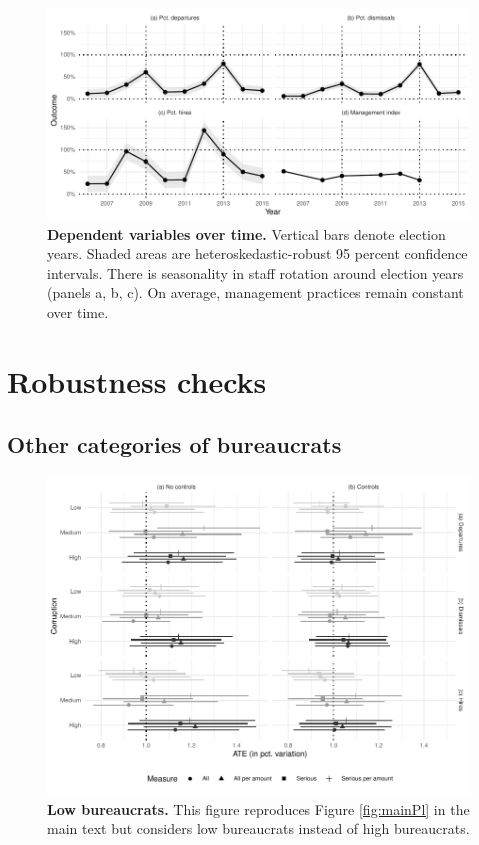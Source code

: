 \documentclass[12pt,a4paper]{article}
\theoremstyle{definition}
\begin{document}
{\begin{figure}[H]
    \centering
    \includegraphics{figures/dependentVariables}
    \caption{{\bf Dependent variables over time.} Vertical bars denote election years. Shaded areas are heteroskedastic-robust 95 percent confidence intervals. There is seasonality in staff rotation around election years (panels a, b, c). On average, management practices remain constant over time.}
    \label{fig:dvs}
\end{figure}

\section{Robustness checks}
\label{app:robustness}

\subsection{Other categories of bureaucrats}
\label{app:otherBureaucratsRobustness}

\begin{figure}[H]
    \centering
    \includegraphics{figures/pl_bureaucrat_low.pdf}
    \caption{{\bf Low bureaucrats.} This figure reproduces Figure \ref{fig:mainPl} in the main text but considers low bureaucrats instead of high bureaucrats.}
    \label{fig:plLowBureaucrats}
\end{figure}

}
\end{document}
